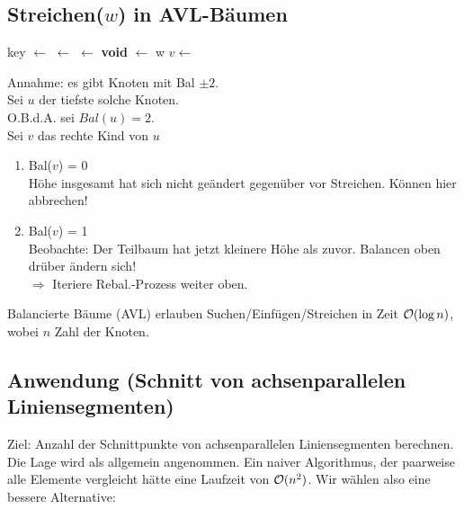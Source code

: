         
        \subsection{Streichen($w$) in AVL-Bäumen}
			\begin{algorithmic}
\begin{algorithm}
	\State key $\gets$ 
		\State {}
		\State {} $\gets$ 
		$\gets$ \textbf{void}
	\EndIf
		\State {} $\gets$ w
		\State {}
	\EndIf
		\State $v \gets$  
		\State {}
		\State {}
	\EndIf
\EndFunction
	
\end{algorithm}
\end{algorithmic}
            Annahme: es gibt Knoten mit Bal $\pm 2$.\\
            Sei $u$ der tiefste solche Knoten.\\
            O.B.d.A. sei $Bal(u) = 2$.\\
            Sei $v$ das rechte Kind von $u$
            \begin{enumerate}
                \item Bal($v$) = 0\\
                Höhe insgesamt hat sich nicht geändert gegenüber vor Streichen. Können hier abbrechen!
                \item Bal($v$) = 1\\
                Beobachte: Der Teilbaum hat jetzt kleinere Höhe als zuvor. Balancen oben drüber ändern sich!\\
                $\Rightarrow$ Iteriere Rebal.-Prozess weiter oben.
            \end{enumerate}
            \begin{satz}
                Balancierte Bäume (AVL) erlauben Suchen/Einfügen/Streichen in Zeit $\mathcal{O}(\log n)$, wobei $n$ Zahl der Knoten.
            \end{satz}
        
        \subsection{Anwendung (Schnitt von achsenparallelen Liniensegmenten)}
            Ziel: Anzahl der Schnittpunkte von achsenparallelen Liniensegmenten berechnen. Die Lage wird als allgemein angenommen.
            Ein naiver Algorithmus, der paarweise alle Elemente vergleicht hätte eine Laufzeit von $\mathcal{O}(n^{2})$. 
            Wir wählen also eine bessere Alternative:
            
